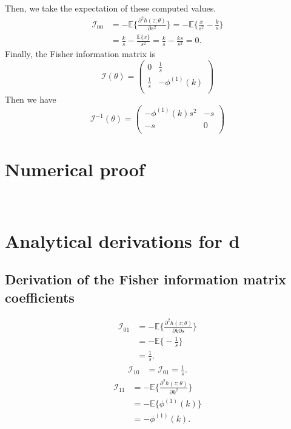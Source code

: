 \documentclass[final]{aomart}
\newtheorem[{}\it]{thm}{Theorem}[section]
\theoremstyle{definition}
\newtheorem*[{}\it]{notation}{Notation}
\numberwithin{equation}{section}
\newcommand{\fisher}{\mathcal{I}} %
\begin{document}
Then, we take the expectation of these computed values.
\begin{equation}
	\begin{aligned}
	\fisher_{00} & = -\mathbb{E}\bigg\{ \frac{\partial^2 h(z;\theta)}{\partial s^2} \bigg\} = -\mathbb{E}\bigg\{ \frac{x}{s^2} - \frac{k}{s} \bigg\}\\
					   & = \frac{k}{s} - \frac{\mathbb{E}\{ x \}}{s^2} = \frac{k}{s} - \frac{ks}{s^2} = 0.
	\end{aligned}
\end{equation}
Finally, the Fisher information matrix is 
\[ \fisher(\theta) = \left( \begin{array}{cc}
	0              & \frac{1}{s} \\
	\frac{1}{s} & -\phi^{(1)}(k) \\
	 \end{array} \right)\] 
Then we have
\[ \fisher^{-1}(\theta) = \left( \begin{array}{cc}
	-\phi^{(1)}(k)s^2 & -s \\
	-s    & 0 \\
\end{array} \right) \] 
\section{Numerical proof}
\appendix
\section{\\Analytical derivations for d}
\subsection{Derivation of the Fisher information matrix coefficients}
\label{fischer derivation}
\begin{equation}
\begin{aligned}
\fisher_{01} & = -\mathbb{E}\bigg\{ \frac{\partial^2 h(z;\theta)}{\partial k\partial s} \bigg\}\\
& = -\mathbb{E}\bigg\{ -\frac{1}{s} \bigg\}\\
& = \frac{1}{s}.
\end{aligned}
\end{equation}
\begin{equation}
\begin{aligned}
\fisher_{10} & = \fisher_{01} = \frac{1}{s}.
\end{aligned}
\end{equation}
\begin{equation}
\begin{aligned}
\fisher_{11} & = -\mathbb{E}\bigg\{ \frac{\partial^2 h(z;\theta)}{\partial k^2} \bigg\}\\
& = -\mathbb{E}\bigg\{ \phi^{(1)}(k) \bigg\}\\
& = -\phi^{(1)}(k).
\end{aligned}
\end{equation}
\end{document}
